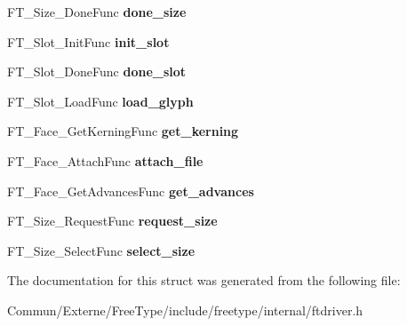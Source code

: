 \begin{DoxyCompactItemize}
\item 
F\+T\+\_\+\+Size\+\_\+\+Done\+Func {\bfseries done\+\_\+size}\hypertarget{struct_f_t___driver___class_rec___a5c96f627816a089b27bcff09f22dd1a6}{}\label{struct_f_t___driver___class_rec___a5c96f627816a089b27bcff09f22dd1a6}

\item 
F\+T\+\_\+\+Slot\+\_\+\+Init\+Func {\bfseries init\+\_\+slot}\hypertarget{struct_f_t___driver___class_rec___ae4e1d4ec7bdbdee0b4a5f8fc8f113d30}{}\label{struct_f_t___driver___class_rec___ae4e1d4ec7bdbdee0b4a5f8fc8f113d30}

\item 
F\+T\+\_\+\+Slot\+\_\+\+Done\+Func {\bfseries done\+\_\+slot}\hypertarget{struct_f_t___driver___class_rec___a548a343f5921f5d341142bf3743c42d4}{}\label{struct_f_t___driver___class_rec___a548a343f5921f5d341142bf3743c42d4}

\item 
F\+T\+\_\+\+Slot\+\_\+\+Load\+Func {\bfseries load\+\_\+glyph}\hypertarget{struct_f_t___driver___class_rec___a49dbd71e64094d4d825b8b8d51dd4e47}{}\label{struct_f_t___driver___class_rec___a49dbd71e64094d4d825b8b8d51dd4e47}

\item 
F\+T\+\_\+\+Face\+\_\+\+Get\+Kerning\+Func {\bfseries get\+\_\+kerning}\hypertarget{struct_f_t___driver___class_rec___a398395bfdbef65a8d531724d200ed91c}{}\label{struct_f_t___driver___class_rec___a398395bfdbef65a8d531724d200ed91c}

\item 
F\+T\+\_\+\+Face\+\_\+\+Attach\+Func {\bfseries attach\+\_\+file}\hypertarget{struct_f_t___driver___class_rec___a9caec9ae56a4bab9c90cede699279f29}{}\label{struct_f_t___driver___class_rec___a9caec9ae56a4bab9c90cede699279f29}

\item 
F\+T\+\_\+\+Face\+\_\+\+Get\+Advances\+Func {\bfseries get\+\_\+advances}\hypertarget{struct_f_t___driver___class_rec___aad560cd145b6d7cab7eae79194b1d724}{}\label{struct_f_t___driver___class_rec___aad560cd145b6d7cab7eae79194b1d724}

\item 
F\+T\+\_\+\+Size\+\_\+\+Request\+Func {\bfseries request\+\_\+size}\hypertarget{struct_f_t___driver___class_rec___a03ff7c2e4a2fb6d08eb481b03a78e8de}{}\label{struct_f_t___driver___class_rec___a03ff7c2e4a2fb6d08eb481b03a78e8de}

\item 
F\+T\+\_\+\+Size\+\_\+\+Select\+Func {\bfseries select\+\_\+size}\hypertarget{struct_f_t___driver___class_rec___a1b365eb82525dae0a816974d949fe0dd}{}\label{struct_f_t___driver___class_rec___a1b365eb82525dae0a816974d949fe0dd}

\end{DoxyCompactItemize}


The documentation for this struct was generated from the following file\+:\begin{DoxyCompactItemize}
\item 
Commun/\+Externe/\+Free\+Type/include/freetype/internal/ftdriver.\+h\end{DoxyCompactItemize}
